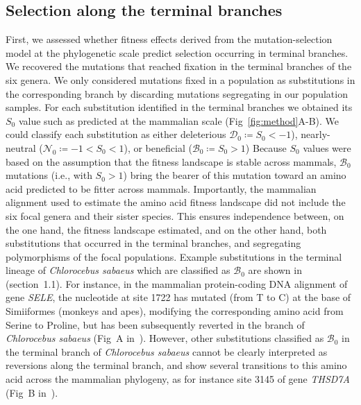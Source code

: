 \documentclass[10pt,letterpaper]{article}
\newcommand{\Sphy}{S_{0}}
\newcommand{\SphyDel}{\mathcal{D}_0}
\newcommand{\SphyNeu}{\mathcal{N}_0}
\newcommand{\SphyBen}{\mathcal{B}_0}
\begin{document}
\subsection*{Selection along the terminal branches}
First, we assessed whether fitness effects derived from the mutation-selection model at the phylogenetic scale predict selection occurring in terminal branches.
We recovered the mutations that reached fixation in the terminal branches of the six genera.
We only considered mutations fixed in a population as substitutions in the corresponding branch by discarding mutations segregating in our population samples.
For each substitution identified in the terminal branches we obtained its $\Sphy$ value such as predicted at the mammalian scale (Fig~\ref{fig:method}A-B).
We could classify each substitution as either deleterious $\SphyDel \coloneqq \Sphy < -1$), nearly-neutral ($\SphyNeu \coloneqq -1 < \Sphy <1$), or beneficial ($\SphyBen \coloneqq \Sphy > 1$)
Because $\Sphy$ values were based on the assumption that the fitness landscape is stable across mammals, $\SphyBen$ mutations (i.e., with $\Sphy>1$) bring the bearer of this mutation toward an amino acid predicted to be fitter across mammals.
Importantly, the mammalian alignment used to estimate the amino acid fitness landscape did not include the six focal genera and their sister species.
This ensures independence between, on the one hand, the fitness landscape estimated, and on the other hand, both substitutions that occurred in the terminal branches, and segregating polymorphisms of the focal populations.
Example substitutions in the terminal lineage of \textit{Chlorocebus sabaeus} which are classified as $\SphyBen$ are shown in~ (section~1.1).
For instance, in the mammalian protein-coding DNA alignment of gene \textit{SELE}, the nucleotide at site 1722 has mutated (from T to C) at the base of Simiiformes (monkeys and apes), modifying the corresponding amino acid from Serine to Proline, but has been subsequently reverted in the branch of \textit{Chlorocebus sabaeus} (Fig~A in~).
However, other substitutions classified as $\SphyBen$ in the terminal branch of \textit{Chlorocebus sabaeus} cannot be clearly interpreted as reversions along the terminal branch, and show several transitions to this amino acid across the mammalian phylogeny, as for instance site 3145 of gene \textit{THSD7A} (Fig~B in~).
\end{document}
